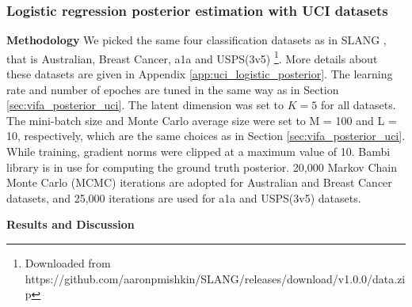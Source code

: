 \documentclass[10pt]{article} %
\begin{document}
\subsubsection{Logistic regression posterior estimation with UCI datasets}
\label{sec:vifa_logistic_posterior_uci}
\textbf{Methodology} We picked the same four classification datasets as in SLANG \cite{mishkin2018}, that is Australian, Breast Cancer, a1a and USPS(3v5) \footnote{Downloaded from https://github.com/aaronpmishkin/SLANG/releases/download/v1.0.0/data.zip}. More details about these datasets are given in Appendix \ref{app:uci_logistic_posterior}. The learning rate and number of epoches are tuned in the same way as in Section \ref{sec:vifa_posterior_uci}. The latent dimension was set to $K = 5$ for all datasets. The mini-batch size and
Monte Carlo average size were set to M = 100 and L = 10, respectively, which are the same choices as in Section \ref{sec:vifa_posterior_uci}. While training, gradient norms were clipped at a maximum value of 10. Bambi library \cite{Capretto2022} is in use for computing the ground truth posterior. 20,000 Markov Chain Monte Carlo (MCMC) iterations are adopted for Australian and Breast Cancer datasets, and 25,000 iterations are used for a1a and USPS(3v5) datasets.


\textbf{Results and Discussion}
\end{document}
